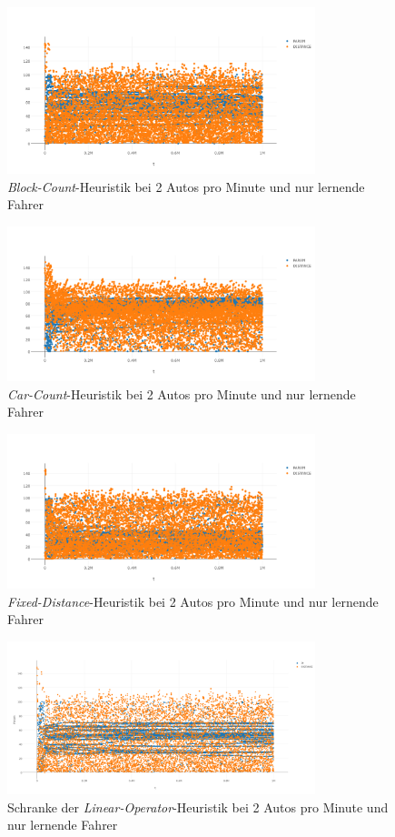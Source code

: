 \begin{figure}[H]
	\includegraphics[width=0.8\textwidth]{analyse/JustHeuristik/2pm/block2just.png}
	\caption{\emph{Block-Count}-Heuristik bei 2 Autos pro Minute und nur lernende Fahrer}\label{fig:ap_jh_bs_2}
\end{figure}
\begin{figure}[H]
	\includegraphics[width=0.8\textwidth]{analyse/JustHeuristik/2pm/car2just.png}
	\caption{\emph{Car-Count}-Heuristik bei 2 Autos pro Minute und nur lernende Fahrer}\label{fig:ap_jh_cc_2}
\end{figure}
\begin{figure}[H]
	\includegraphics[width=0.8\textwidth]{analyse/JustHeuristik/2pm/fixed2just.png}
	\caption{\emph{Fixed-Distance}-Heuristik bei 2 Autos pro Minute und nur lernende Fahrer}\label{fig:ap_jh_fd_2}
\end{figure}
\begin{figure}[H]
	\includegraphics[width=0.8\textwidth]{analyse/JustHeuristik/2pm/linop.png}
	\caption{Schranke der \emph{Linear-Operator}-Heuristik bei 2 Autos pro Minute und nur lernende Fahrer}\label{fig:ap_jh_loz_2}
\end{figure}
